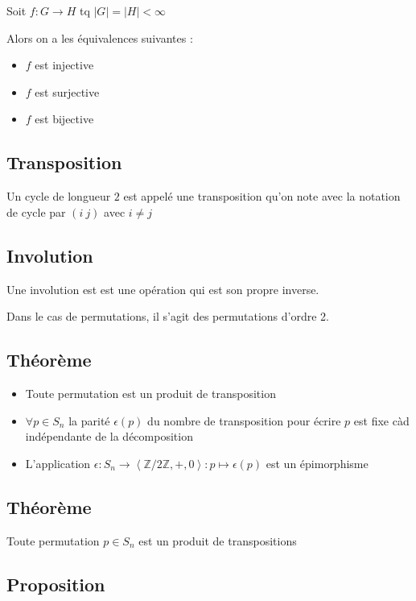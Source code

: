 \documentclass[a4paper,10pt]{article}
\newcommand{\card}[1]{\left\vert #1 \right\vert}
\newcommand{\grp}[1]{\left\langle #1 \right\rangle}
\newcommand{\ap}{\rightarrow}
\newcommand{\Z}{\mathbb{Z}}
\begin{document}
Soit $f : G \ap H$ tq $\card{ G } = \card{ H } < \infty$

Alors on a les équivalences suivantes :

\begin{itemize}
	\item{$f$ est injective}
	\item{$f$ est surjective}
	\item{$f$ est bijective}	
\end{itemize}

\subsection{Transposition}

Un cycle de longueur $2$ est appelé une transposition qu'on note avec la notation de cycle par $(i~j)$ avec $i \neq j$

\subsection{Involution}

Une involution est est une opération qui est son propre inverse.

Dans le cas de permutations, il s'agit des permutations d'ordre 2.

\subsection{Théorème}

\begin{itemize}
	\item{Toute permutation est un produit de transposition}
	\item{$\forall p \in S_n$ la parité $\epsilon(p)$ du nombre de transposition pour écrire $p$ est fixe càd indépendante de la décomposition}
	\item{L'application $\epsilon : S_n \ap \grp{\Z / 2 \Z, + , 0} : p \mapsto \epsilon(p)$ est un épimorphisme}
\end{itemize}

\subsection{Théorème}

Toute permutation $p \in S_n$ est un produit de transpositions

\subsection{Proposition}
\end{document}
